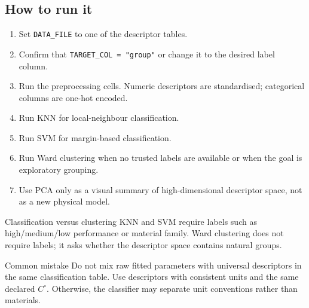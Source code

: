 \documentclass[journal=jacsat,manuscript=article]{achemso}
\begin{document}
\subsection*{How to run it}

\begin{enumerate}
	\item Set \texttt{DATA\_FILE} to one of the descriptor tables.
	\item Confirm that \texttt{TARGET\_COL = "group"} or change it to the
	desired label column.
	\item Run the preprocessing cells. Numeric descriptors are standardised;
	categorical columns are one-hot encoded.
	\item Run KNN for local-neighbour classification.
	\item Run SVM for margin-based classification.
	\item Run Ward clustering when no trusted labels are available or when the
	goal is exploratory grouping.
	\item Use PCA only as a visual summary of high-dimensional descriptor
	space, not as a new physical model.
\end{enumerate}

\begin{greenbox}{Classification versus clustering}
	KNN and SVM require labels such as high/medium/low performance or
	material family. Ward clustering does not require labels; it asks whether
	the descriptor space contains natural groups.
\end{greenbox}

\begin{redbox}{Common mistake}
	Do not mix raw fitted parameters with universal descriptors in the same
	classification table. Use descriptors with consistent units and the same
	declared \(C^\circ\). Otherwise, the classifier may separate unit
	conventions rather than materials.
\end{redbox}


% 
\end{document}
